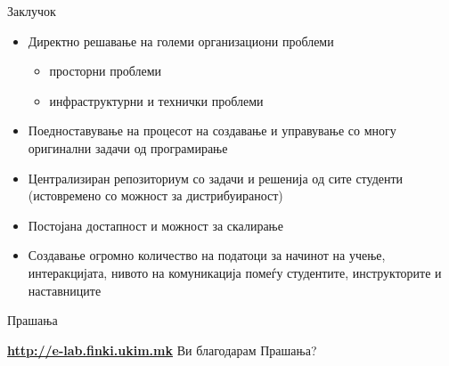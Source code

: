 \begin{frame}{Заклучок}
	\begin{itemize}[<+-| alert@+>]
	  \item Директно решавање на големи организациони проблеми
	   \begin{itemize}
	   \item просторни проблеми
	   \item инфраструктурни и технички проблеми
	  \end{itemize}
	  \item Поедноставување на процесот на создавање и управување со
	  многу оригинални задачи од програмирање
	  \item Централизиран репозиториум со задачи и решенија од сите студенти
	  (истовремено со можност за дистрибуираност)
	  \item Постојана достапност и можност за скалирање
	  \item Создавање огромно количество на податоци за начинот на учење,
	  интеракцијата, нивото на комуникација помеѓу студентите, инструкторите и
	  наставниците
	\end{itemize}
\end{frame}

\begin{frame}{Прашања}{}
	\begin{center}
	\Large{
    \href{http://e-lab.finki.ukim.mk/}{\textbf{http://e-lab.finki.ukim.mk}}}
    \vfill
    \huge{Ви благодарам}
    \vfill    
    \Huge{Прашања?}
	
	\end{center}
\end{frame}


